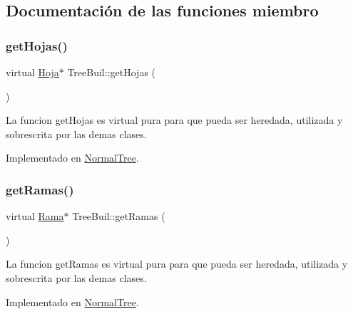 \subsection{Documentación de las funciones miembro}
\mbox{\label{classTreeBuil_a76ddaf2d79386ffabe5bf17e0c6d887e}} 
\subsubsection{\texorpdfstring{get\+Hojas()}{getHojas()}}
{\footnotesize\ttfamily virtual \hyperlink{classHoja}{Hoja}$\ast$ Tree\+Buil\+::get\+Hojas (\begin{DoxyParamCaption}{ }\end{DoxyParamCaption})\hspace{0.3cm}{\ttfamily [pure virtual]}}

La funcion get\+Hojas es virtual pura para que pueda ser heredada, utilizada y sobrescrita por las demas clases. 

Implementado en \hyperlink{classNormalTree_af856515defde72c7d3350902bfe1cc3e}{Normal\+Tree}.

\mbox{\label{classTreeBuil_ad8c90d4466a151a8082eeae13400e6cc}} 
\subsubsection{\texorpdfstring{get\+Ramas()}{getRamas()}}
{\footnotesize\ttfamily virtual \hyperlink{classRama}{Rama}$\ast$ Tree\+Buil\+::get\+Ramas (\begin{DoxyParamCaption}{ }\end{DoxyParamCaption})\hspace{0.3cm}{\ttfamily [pure virtual]}}

La funcion get\+Ramas es virtual pura para que pueda ser heredada, utilizada y sobrescrita por las demas clases. 

Implementado en \hyperlink{classNormalTree_ad96708fd66844690669bd9d733b41063}{Normal\+Tree}.

\mbox{\label{classTreeBuil_a083d65b3e44e233b9a2a9305bcdabb8c}} 
